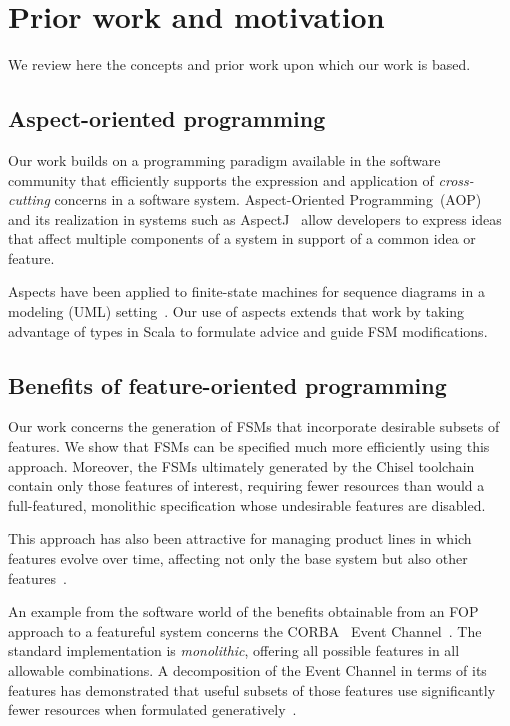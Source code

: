 \documentclass[conference]{IEEEtran}
\begin{document}
\section{Prior work and motivation}\label{sec:prior}

We review here the concepts and prior work upon which our work is based.
\subsection{Aspect-oriented programming}

Our work builds on a programming paradigm available in the software community that efficiently supports the expression and application of \emph{cross-cutting} concerns in a software system.  Aspect-Oriented Programming~(AOP)~\cite{gregor:97} and its realization in systems such as AspectJ~\cite{aspectj} allow developers to express ideas that affect multiple components of a system in support of a common idea or feature. 

Aspects have been applied to finite-state machines for sequence diagrams in a modeling (UML) setting~\cite{aspectsUML}.  Our use of aspects extends that work by taking advantage of types in Scala to formulate advice and guide FSM modifications. 

\subsection{Benefits of feature-oriented programming}\label{sec:benefop}

Our work concerns the generation of FSMs that incorporate desirable subsets of features.  We show that FSMs can be specified much more efficiently using this approach.  Moreover, the FSMs ultimately generated by the Chisel toolchain contain only those features of interest, requiring fewer resources than would a full-featured, monolithic specification whose undesirable features are disabled.

This approach has also been attractive for managing product lines in which features evolve over time, affecting not only the base system but also other features~\cite{10.1145/2897695.2897701}. 

An example from the software world of the benefits obtainable from an FOP approach to a featureful system concerns the CORBA~\cite{CORBA:00} Event Channel~\cite{CORBAService:02a}. The standard implementation is \emph{monolithic}, offering all possible features in all allowable combinations.  A decomposition of the Event Channel in terms of its features has demonstrated that useful subsets of those features use significantly fewer resources when formulated generatively~\cite{Pratap:04}.   
\end{document}
